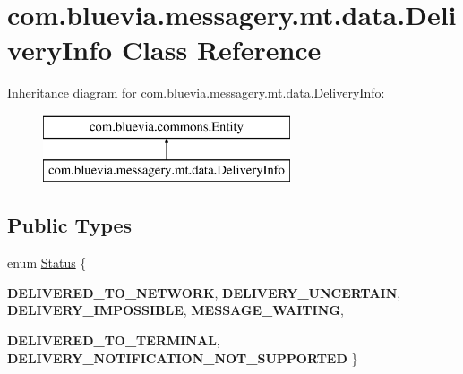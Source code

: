 \hypertarget{classcom_1_1bluevia_1_1messagery_1_1mt_1_1data_1_1DeliveryInfo}{
\section{com.bluevia.messagery.mt.data.DeliveryInfo Class Reference}
\label{classcom_1_1bluevia_1_1messagery_1_1mt_1_1data_1_1DeliveryInfo}
}
Inheritance diagram for com.bluevia.messagery.mt.data.DeliveryInfo:\begin{figure}[H]
\begin{center}
\leavevmode
\includegraphics[height=2.000000cm]{classcom_1_1bluevia_1_1messagery_1_1mt_1_1data_1_1DeliveryInfo}
\end{center}
\end{figure}
\subsection*{Public Types}
\begin{DoxyCompactItemize}
\item 
enum \hyperlink{classcom_1_1bluevia_1_1messagery_1_1mt_1_1data_1_1DeliveryInfo_a37e8b97cdabdb2ac55c095e44cd8e32f}{Status} \{ \par
{\bfseries DELIVERED\_\-TO\_\-NETWORK}, 
{\bfseries DELIVERY\_\-UNCERTAIN}, 
{\bfseries DELIVERY\_\-IMPOSSIBLE}, 
{\bfseries MESSAGE\_\-WAITING}, 
\par
{\bfseries DELIVERED\_\-TO\_\-TERMINAL}, 
{\bfseries DELIVERY\_\-NOTIFICATION\_\-NOT\_\-SUPPORTED}
 \}
\end{DoxyCompactItemize}
